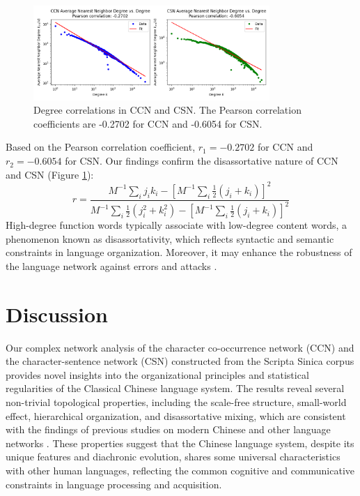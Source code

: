 \documentclass[11pt]{article}
\begin{document}
\begin{figure}[htbp]
    \centering
    \includegraphics[width=0.8\textwidth]{../analysis/knn/knn.png}
    \caption{Degree correlations in CCN and CSN. The Pearson correlation coefficients are -0.2702 for CCN and -0.6054 for CSN.}
    \label{fig:degree_correlation}
    \end{figure}
    Based on the Pearson correlation coefficient, $r_1=-0.2702$ for CCN and $r_2=-0.6054$ for CSN. Our findings confirm the disassortative nature of CCN and CSN (Figure \ref{fig:degree_correlation}):
    \begin{equation}
    r = \frac{M^{-1}\sum_{i}j_ik_i-[M^{-1}\sum_{i}\frac{1}{2}(j_i+k_i)]^2}{M^{-1}\sum_{i}\frac{1}{2}(j_i^2+k_i^2)-[M^{-1}\sum_{i}\frac{1}{2}(j_i+k_i)]^2}
    \end{equation}
    High-degree function words typically associate with low-degree content words, a phenomenon known as disassortativity, which reflects syntactic and semantic constraints in language organization. Moreover, it may enhance the robustness of the language network against errors and attacks \cite{newman2002assortative}.
\section{Discussion}
Our complex network analysis of the character co-occurrence network (CCN) and the character-sentence network (CSN) constructed from the Scripta Sinica corpus provides novel insights into the organizational principles and statistical regularities of the Classical Chinese language system. The results reveal several non-trivial topological properties, including the scale-free structure, small-world effect, hierarchical organization, and disassortative mixing, which are consistent with the findings of previous studies on modern Chinese and other language networks \cite{sole2010language}. These properties suggest that the Chinese language system, despite its unique features and diachronic evolution, shares some universal characteristics with other human languages, reflecting the common cognitive and communicative constraints in language processing and acquisition.
\end{document}
